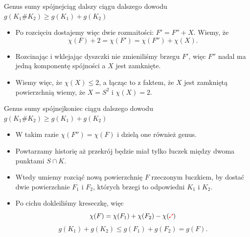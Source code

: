 \begin{frame}{Genus sumy spójnej}{ciąg dalszy ciągu dalszego dowodu $g(K_1\# K_2)\geq g(K_1)+g(K_2)$}
  \begin{itemize}
    \item Po rozcięciu dostajemy więc dwie rozmaitości: $F'=F''+X$. Wiemy, że 
      $$\chi(F)+2=\chi(F')=\chi(F'')+\chi(X).$$
    \item Rozcinając i wklejając dyszczki nie zmieniliśmy brzegu $F'$, więc $F''$ nadal ma jedną komponentę spójności a $X$ jest zamknięte.
    \item Wiemy więc, że $\chi(X)\leq 2$, a łącząc to z faktem, że $X$ jest zamkniętą powierzchnią wiemy, że $X=S^2$ i $\chi(X)=2$.
  \end{itemize}
\end{frame}

\begin{frame}{Genus sumy spójnej}{koniec ciągu dalszego dowodu $g(K_1\# K_2)\geq g(K_1)+g(K_2)$}
  \begin{itemize}
    \item W takim razie $\chi(F'')=\chi(F)$ i dzielą one również genus.
    \item Powtarzamy historię aż przekrój będzie miał tylko łuczek między dwoma punktami $S\cap K$.
    \item Wtedy umiemy rozciąć nową powierzchnię $F$ rzeczonym łuczkiem, by dostać dwie powierzchnie $F_1$ i $F_2$, których brzegi to odpowiedni $K_1$ i $K_2$.
    \item Po cichu dokleiliśmy kreseczkę, więc
      $$\chi(F)=\chi(F_1)+\chi(F_2)-\chi(\kreska)$$
      $$g(K_1)+g(K_2)\leq g(F_1)+g(F_2)=g(F).$$
  \end{itemize}

\end{frame}
